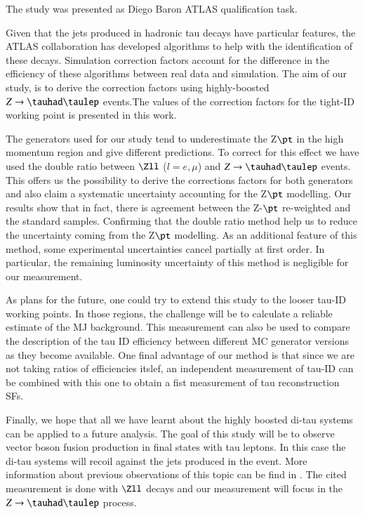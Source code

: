 The study was presented as Diego Baron ATLAS qualification task.

Given that the jets produced in hadronic tau decays have particular features, the ATLAS collaboration has developed algorithms to help with the identification of these decays. Simulation correction factors account for the difference in the efficiency of these algorithms between real data and simulation. The aim of our study, is to derive the correction factors using highly-boosted $Z\to\tauhad\taulep$ events.The values of the correction factors for the tight-ID working point is presented in this work. 

The generators used for our study tend to underestimate the Z$\pt$ in the high momentum region and give different predictions. To correct for this effect we have used the double ratio between $\Zll$ ($l=e,\mu$) and $Z\to\tauhad\taulep$ events. This offers us the possibility to derive the corrections factors for both generators and also claim a systematic uncertainty accounting for the Z$\pt$ modelling. Our results show that in fact, there is agreement between the Z-$\pt$ re-weighted and the standard samples. Confirming that the double ratio method help us to reduce the uncertainty coming from the Z$\pt$ modelling. As an additional feature of this method, some experimental uncertainties cancel partially at first order. In particular, the remaining luminosity uncertainty of this method is negligible for our measurement.


As plans for the future, one could try to extend this study to the looser tau-ID working points. In those regions, the challenge will be to calculate a reliable estimate of the MJ background. This measurement can also be used to compare the description of the tau ID efficiency between different MC generator versions as they become available. One final advantage of our method is that since we are not taking ratios of efficiencies itslef, an independent measurement of tau-ID can be combined with this one to obtain a fist measurement of tau reconstruction SFs.

Finally, we hope that all we have learnt about the highly boosted di-tau systems can be applied to a future analysis.  The goal of this study will be to observe vector boson fusion production in final states with tau leptons. In this case the di-tau systems will recoil against the jets produced in the event. More information about previous observations of this topic can be find in \cite{Aad:2014dta,Aaboud:2017emo}. The cited measurement is done with $\Zll$ decays and our measurement will focus in the $Z\to\tauhad\taulep$ process.